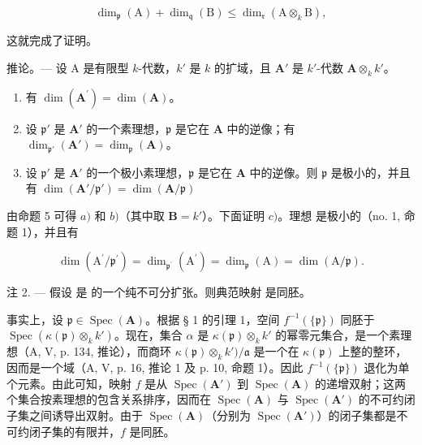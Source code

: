 \[
\dim_ {\mathfrak {p}} (\mathrm{A}) + \dim_ {\mathfrak {q}} (\mathrm{B}) \leqslant \dim_ {\mathfrak {r}} (\mathrm{A} \otimes_ {k} \mathrm{B}),
\]

这就完成了证明。

推论。--- 设 A 是有限型 \(k\)-代数，\(k'\) 是 \(k\) 的扩域，且 \(\mathbf{A}'\) 是 \(k'\)-代数 \(\mathbf{A} \otimes_k k'\)。

\begin{enumerate}
\def\labelenumi{\alph{enumi})}
\item
  有 \(\dim (\mathbf{A}^{\prime}) = \dim (\mathbf{A})\)。
\item
  设 \(\mathfrak{p}'\) 是 \(\mathbf{A}'\) 的一个素理想，\(\mathfrak{p}\) 是它在 \(\mathbf{A}\) 中的逆像；有 \(\dim_{\mathfrak{p}'}(\mathbf{A}') = \dim_{\mathfrak{p}}(\mathbf{A})\)。
\item
  设 \(\mathfrak{p}'\) 是 \(\mathbf{A}'\) 的一个极小素理想，\(\mathfrak{p}\) 是它在 \(\mathbf{A}\) 中的逆像。则 \(\mathfrak{p}\) 是极小的，并且有 \(\dim(\mathbf{A}'/\mathfrak{p}') = \dim(\mathbf{A}/\mathfrak{p})\)
\end{enumerate}

由命题 5 可得 \(a)\) 和 \(b)\)（其中取 \(\mathbf{B} = k'\)）。下面证明 \(c)\)。理想  是极小的（no. 1, 命题 1），并且有

\[
\dim (\mathrm{A} ^ {\prime} / \mathfrak {p} ^ {\prime}) = \dim_ {\mathfrak {p} ^ {\prime}} (\mathrm{A} ^ {\prime}) = \dim_ {\mathfrak {p}} (\mathrm{A}) = \dim (\mathrm{A} / \mathfrak {p}).
\]

注 2. --- 假设  是  的一个纯不可分扩张。则典范映射  是同胚。

事实上，设 \(\mathfrak{p} \in \operatorname{Spec}(\mathbf{A})\)。根据 § 1 的引理 1，空间 \(f^{-1}(\{\mathfrak{p}\})\) 同胚于 \(\operatorname{Spec}(\kappa(\mathfrak{p}) \otimes_k k')\)。现在，集合 \(\alpha\) 是 \(\kappa(\mathfrak{p}) \otimes_k k'\) 的幂零元集合，是一个素理想（A, V, p. 134, 推论），而商环 \(\kappa(\mathfrak{p}) \otimes_k k')/\mathfrak{a}\) 是一个在 \(\kappa(\mathfrak{p})\) 上整的整环，因而是一个域（A, V, p. 16, 推论 1 及 p. 10, 命题 1）。因此 \(f^{-1}(\{\mathfrak{p}\})\) 退化为单个元素。由此可知，映射 \(f\) 是从 \(\operatorname{Spec}(\mathbf{A}')\) 到 \(\operatorname{Spec}(\mathbf{A})\) 的递增双射；这两个集合按素理想的包含关系排序，因而在 \(\operatorname{Spec}(\mathbf{A})\) 与 \(\operatorname{Spec}(\mathbf{A}')\) 的不可约闭子集之间诱导出双射。由于 \(\operatorname{Spec}(\mathbf{A})\)（分别为 \(\operatorname{Spec}(\mathbf{A}')\)）的闭子集都是不可约闭子集的有限并，\(f\) 是同胚。

